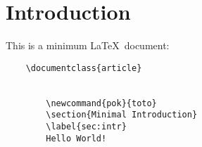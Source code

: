 \section{Introduction}

This is a minimum \LaTeX\ document:

\begin{verbatim}
    \documentclass{article}

    
        \newcommand{pok}{toto}
        \section{Minimal Introduction}
        \label{sec:intr}
        Hello World!
    
\end{verbatim}

